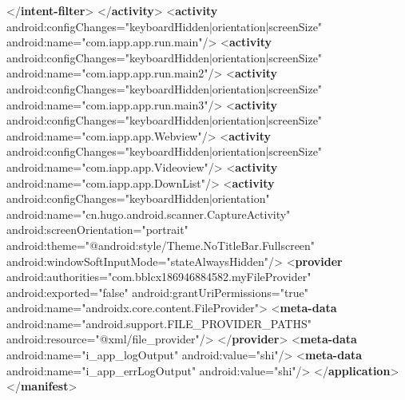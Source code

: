 \documentclass[
]{article}
\newenvironment{Shaded}{}{}
\newcommand{\KeywordTok}[1]{\textcolor[rgb]{0.00,0.44,0.13}{\textbf{#1}}}
\newcommand{\NormalTok}[1]{#1}
\newcommand{\OtherTok}[1]{\textcolor[rgb]{0.00,0.44,0.13}{#1}}
\newcommand{\StringTok}[1]{\textcolor[rgb]{0.25,0.44,0.63}{#1}}
\begin{document}
\begin{Shaded}
\begin{Highlighting}[]
\NormalTok{            \textless{}/}\KeywordTok{intent{-}filter}\NormalTok{\textgreater{}}
\NormalTok{        \textless{}/}\KeywordTok{activity}\NormalTok{\textgreater{}}
\NormalTok{        \textless{}}\KeywordTok{activity}\OtherTok{ android:configChanges=}\StringTok{"keyboardHidden|orientation|screenSize"}\OtherTok{ android:name=}\StringTok{"com.iapp.app.run.main"}\NormalTok{/\textgreater{}}
\NormalTok{        \textless{}}\KeywordTok{activity}\OtherTok{ android:configChanges=}\StringTok{"keyboardHidden|orientation|screenSize"}\OtherTok{ android:name=}\StringTok{"com.iapp.app.run.main2"}\NormalTok{/\textgreater{}}
\NormalTok{        \textless{}}\KeywordTok{activity}\OtherTok{ android:configChanges=}\StringTok{"keyboardHidden|orientation|screenSize"}\OtherTok{ android:name=}\StringTok{"com.iapp.app.run.main3"}\NormalTok{/\textgreater{}}
\NormalTok{        \textless{}}\KeywordTok{activity}\OtherTok{ android:configChanges=}\StringTok{"keyboardHidden|orientation|screenSize"}\OtherTok{ android:name=}\StringTok{"com.iapp.app.Webview"}\NormalTok{/\textgreater{}}
\NormalTok{        \textless{}}\KeywordTok{activity}\OtherTok{ android:configChanges=}\StringTok{"keyboardHidden|orientation|screenSize"}\OtherTok{ android:name=}\StringTok{"com.iapp.app.Videoview"}\NormalTok{/\textgreater{}}
\NormalTok{        \textless{}}\KeywordTok{activity}\OtherTok{ android:name=}\StringTok{"com.iapp.app.DownList"}\NormalTok{/\textgreater{}}
\NormalTok{        \textless{}}\KeywordTok{activity}\OtherTok{ android:configChanges=}\StringTok{"keyboardHidden|orientation"}\OtherTok{ android:name=}\StringTok{"cn.hugo.android.scanner.CaptureActivity"}\OtherTok{ android:screenOrientation=}\StringTok{"portrait"}\OtherTok{ android:theme=}\StringTok{"@android:style/Theme.NoTitleBar.Fullscreen"}\OtherTok{ android:windowSoftInputMode=}\StringTok{"stateAlwaysHidden"}\NormalTok{/\textgreater{}}
\NormalTok{        \textless{}}\KeywordTok{provider}\OtherTok{ android:authorities=}\StringTok{"com.bblcx186946884582.myFileProvider"}\OtherTok{ android:exported=}\StringTok{"false"}\OtherTok{ android:grantUriPermissions=}\StringTok{"true"}\OtherTok{ android:name=}\StringTok{"androidx.core.content.FileProvider"}\NormalTok{\textgreater{}}
\NormalTok{            \textless{}}\KeywordTok{meta{-}data}\OtherTok{ android:name=}\StringTok{"android.support.FILE\_PROVIDER\_PATHS"}\OtherTok{ android:resource=}\StringTok{"@xml/file\_provider"}\NormalTok{/\textgreater{}}
\NormalTok{        \textless{}/}\KeywordTok{provider}\NormalTok{\textgreater{}}
\NormalTok{        \textless{}}\KeywordTok{meta{-}data}\OtherTok{ android:name=}\StringTok{"i\_app\_logOutput"}\OtherTok{ android:value=}\StringTok{"shi"}\NormalTok{/\textgreater{}}
\NormalTok{        \textless{}}\KeywordTok{meta{-}data}\OtherTok{ android:name=}\StringTok{"i\_app\_errLogOutput"}\OtherTok{ android:value=}\StringTok{"shi"}\NormalTok{/\textgreater{}}
\NormalTok{    \textless{}/}\KeywordTok{application}\NormalTok{\textgreater{}}
\NormalTok{\textless{}/}\KeywordTok{manifest}\NormalTok{\textgreater{}}
\end{Highlighting}
\end{Shaded}
\end{document}
